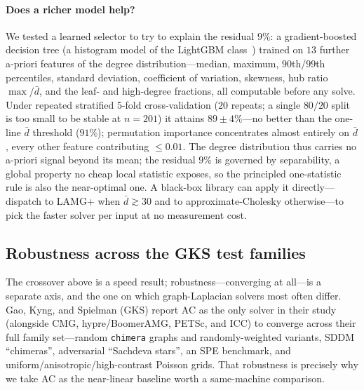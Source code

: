 \documentclass{siamart220329}
\begin{document}
\paragraph{Does a richer model help?} We tested a learned selector to try to explain the residual $9\%$: a gradient-boosted decision tree (a histogram model of the LightGBM class~\cite{lightgbm}) trained on $13$
further a-priori features of the degree distribution---median, maximum, $90$th/$99$th percentiles,
standard deviation, coefficient of variation, skewness, hub ratio $\max/\bar d$, and the leaf- and
high-degree fractions, all computable before any solve. Under repeated stratified $5$-fold
cross-validation ($20$ repeats; a single $80/20$ split is too small to be stable at $n{=}201$) it
attains $89\pm4\%$---no better than the one-line $\bar d$ threshold ($91\%$); permutation importance concentrates almost entirely on $\bar d$, every other feature contributing $\le0.01$. The degree distribution thus carries no
a-priori signal beyond its mean; the residual $9\%$ is governed by separability, a global property no
cheap local statistic exposes, so the principled one-statistic rule is also the near-optimal one. A
black-box library can apply it directly---dispatch to LAMG+ when $\bar d\gtrsim30$ and to
approximate-Cholesky otherwise---to pick the faster solver per input at no measurement cost.

\subsection{Robustness across the GKS test families}\label{sec:families}
The crossover above is a speed result; robustness---converging at all---is a separate axis, and the
one on which graph-Laplacian solvers most often differ. Gao, Kyng, and Spielman (GKS) \cite{gks2023}
report AC as the only solver in their study (alongside CMG, hypre/BoomerAMG, PETSc, and ICC) to
converge across their full family set---random \texttt{chimera} graphs and randomly-weighted
variants, SDDM ``chimeras'', adversarial ``Sachdeva stars'', an SPE benchmark, and
uniform/anisotropic/high-contrast Poisson grids. That robustness is precisely why we take AC as the
near-linear baseline worth a same-machine comparison.
\end{document}
